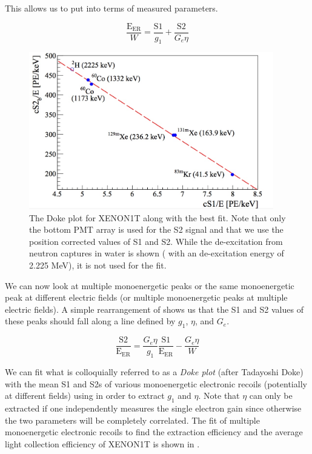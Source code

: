   This allows us to put  into terms of measured parameters.
  
\begin{equation}
        \label{eqn:xe1t_anticorrelation_s1_s2}
        \frac{\textrm{E}_{\textrm{ER}}}{W} = \frac{\textrm{S1}}{g_1} + \frac{\textrm{S2}}{G_e \eta}
\end{equation}
 
  \begin{figure}[t]
	\centering
	\includegraphics[width=0.95\textwidth]{xe1t_doke_plot}
	\caption{The Doke plot for XENON1T along with the best fit.  Note that only the bottom PMT array is used for the S2 signal and that we use the position corrected values of S1 and S2.  While the de-excitation from neutron captures in water is shown ( with an de-excitation energy of 2.225 MeV), it is not used for the fit.}
	\label{fig:xe1t_doke_plot}
\end{figure}

 
We can now look at multiple monoenergetic peaks or the same monoenergetic peak at different electric fields (or multiple monoenergetic peaks at multiple electric fields).  A simple rearrangement of  shows us that the S1 and S2 values of these peaks should fall along a line defined by $g_1$, $\eta$, and $G_e$.

 \begin{equation}
        \label{eqn:xe1t_anticorrelation_line}
        \frac{\textrm{S2}}{\textrm{E}_{\textrm{ER}}} = \frac{G_e \eta}{g_1} \frac{\textrm{S1}}{\textrm{E}_{\textrm{ER}}} - \frac{G_e \eta}{W}
\end{equation}
 
 We can fit what is colloquially referred to as a \textit{Doke plot} (after Tadayoshi Doke) with the mean S1 and S2s of various monoenergetic electronic recoils (potentially at different fields) using  in order to extract $g_1$ and $\eta$.  Note that $\eta$ can only be extracted if one independently measures the single electron gain since otherwise the two parameters will be completely correlated.  The fit of multiple monoenergetic electronic recoils to find the extraction efficiency and the average light collection efficiency of XENON1T is shown in . 
 
